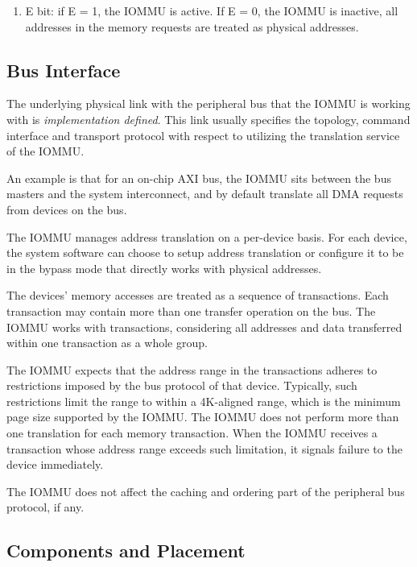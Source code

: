 \begin{enumerate}
    \item E bit: if E = 1, the IOMMU is active. If E = 0, the IOMMU is inactive, all
        addresses in the memory requests are treated as physical addresses.
\end{enumerate}

\subsection{Bus Interface}

The underlying physical link with the peripheral bus that the IOMMU is working with is
\textit{implementation defined}. This link usually specifies the topology, command
interface and transport protocol with respect to utilizing the translation service of
the IOMMU.

An example is that for an on-chip AXI bus, the IOMMU sits between the bus masters and the
system interconnect, and by default translate all DMA requests from devices on the bus.

The IOMMU manages address translation on a per-device basis. For each device, the system
software can choose to setup address translation or configure it to be in the bypass mode
that directly works with physical addresses. 

The devices' memory accesses are treated as a sequence of transactions. Each transaction
may contain more than one transfer operation on the bus. The IOMMU works with
transactions, considering all addresses and data transferred within one transaction as a
whole group.

The IOMMU expects that the address range in the transactions adheres to restrictions
imposed by the bus protocol of that device. Typically, such restrictions limit the range
to within a 4K-aligned range, which is the minimum page size supported by the IOMMU. The
IOMMU does not perform more than one translation for each memory transaction. When the
IOMMU receives a transaction whose address range exceeds such limitation, it signals
failure to the device immediately.

The IOMMU does not affect the caching and ordering part of the peripheral bus protocol, if
any.

\subsection{Components and Placement}

